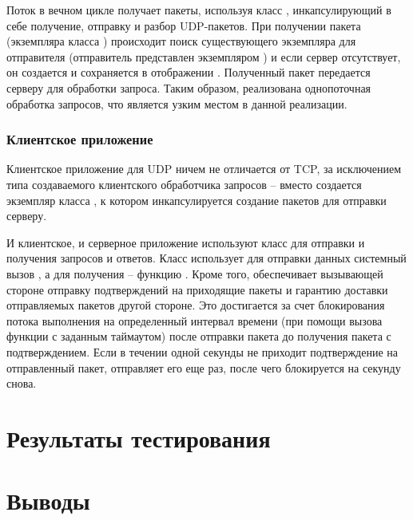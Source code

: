 Поток  в вечном цикле получает пакеты, используя класс , инкапсулирующий в себе получение, отправку и разбор UDP-пакетов. При получении пакета (экземпляра класса ) происходит поиск существующего экземпляра  для отправителя (отправитель представлен экземпляром ) и если сервер отсутствует, он создается и сохраняется в отображении . Полученный пакет передается серверу для обработки запроса. Таким образом, реализована однопоточная обработка запросов, что является узким местом в данной реализации.

\subsubsection{Клиентское приложение}

Клиентское приложение для UDP ничем не отличается от TCP, за исключением типа создаваемого клиентского обработчика запросов -- вместо  создается экземпляр класса , к котором инкапсулируется создание пакетов для отправки серверу.

И клиентское, и серверное приложение используют класс  для отправки и получения запросов и ответов. Класс  использует для отправки данных системный вызов , а для получения -- функцию . Кроме того,  обеспечивает вызывающей стороне отправку подтверждений на приходящие пакеты и гарантию доставки отправляемых пакетов другой стороне. Это достигается за счет блокирования потока выполнения на определенный интервал времени (при помощи вызова функции  с заданным таймаутом) после отправки пакета до получения пакета с подтверждением. Если в течении одной секунды не приходит подтверждение на отправленный пакет,  отправляет его еще раз, после чего блокируется на секунду снова.

\section{Результаты тестирования}


\section{Выводы}

